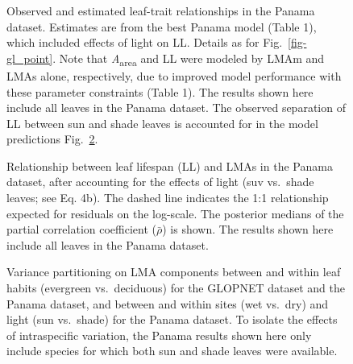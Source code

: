 \documentclass[
  12pt,
  letterpaper,
  DIV=11,
  numbers=noendperiod]{scrartcl}
\begin{document}
\newpage

\begin{figure}


\caption{\label{fig-pa_point}Observed and estimated leaf-trait
relationships in the Panama dataset. Estimates are from the best Panama
model (Table 1), which included effects of light on LL. Details as for
Fig.~\ref{fig-gl_point}. Note that \emph{A}\textsubscript{area} and LL
were modeled by LMAm and LMAs alone, respectively, due to improved model
performance with these parameter constraints (Table 1). The results
shown here include all leaves in the Panama dataset. The observed
separation of LL between sun and shade leaves is accounted for in the
model predictions Fig.~\ref{fig-ll_point}.}

\end{figure}%

\newpage

\begin{figure}


\caption{\label{fig-ll_point}Relationship between leaf lifespan (LL) and
LMAs in the Panama dataset, after accounting for the effects of light
(suv vs.~shade leaves; see Eq. 4b). The dashed line indicates the 1:1
relationship expected for residuals on the log-scale. The posterior
medians of the partial correlation coefficient (\(\bar{\rho}\)) is
shown. The results shown here include all leaves in the Panama dataset.}

\end{figure}%

\newpage

\begin{figure}


\caption{\label{fig-vpart}Variance partitioning on LMA components
between and within leaf habits (evergreen vs.~deciduous) for the GLOPNET
dataset and the Panama dataset, and between and within sites (wet
vs.~dry) and light (sun vs.~shade) for the Panama dataset. To isolate
the effects of intraspecific variation, the Panama results shown here
only include species for which both sun and shade leaves were
available.}

\end{figure}%
\end{document}
